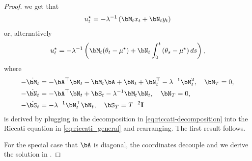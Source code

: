 \begin{proof}
    we get that
    \begin{align}
        \ustar_t = - \lambda^{-1} \left( \bM_t x_t + \bN_t y_t \right)
    \end{align}
    or, alternatively
    \begin{align}\label{eq:riccati_augmented_optimal_control}
        \ustar_t = - \lambda^{-1} \left( \bM_t (\theta_t - \mustar) + \bN_t \int_0^t \left( \theta_s - \mustar \right) d s \right),
    \end{align}
    where
    \begin{align}
        - \dot{\bM_t} &= - \bA^\top \bM_t - \bM_t \bA + \bN_t + \bN_t^\top - \lambda^{-1} \bM_t^2, \quad \bM_T = 0, \\
        - \dot{\bN_t} &= - \bA^\top \bN_t + \bS_t - \lambda^{-1} \bM_t \bN_t, \quad \bN_T = 0, \label{eq:decomposed_riccati} \\
        - \dot{\bS_t} &= - \lambda^{-1} \bN_t^\top \bN_t, \quad \bS_T = T^{-2} \eye
    \end{align}
    is derived by plugging in the decomposition in \eqref{eq:riccati-decomposition} into the Riccati equation in \eqref{eq:riccati_general} and rearranging.
    The first result follows.

    For the special case that $\bA$ is diagonal, the coordinates decouple and we derive the solution in .
\end{proof}

